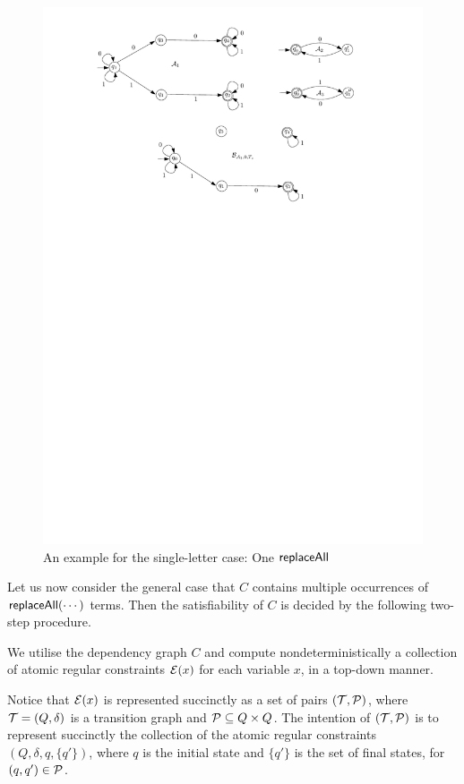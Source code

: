 \begin{example}
\begin{figure}[htbp]
\begin{center}
\includegraphics[scale=0.8]{single-letter-example.pdf}
\end{center}
\caption{An example for the single-letter case: One $\mathsf{replaceAll}$}\label{fig-sl-exmp}
\end{figure}
\end{example}

Let us now consider the general case that $C$ contains multiple occurrences of $\mathsf{replaceAll}(\cdots)$ terms. 
Then the satisfiability of $C$ is decided by the following two-step procedure.

\smallskip

 We utilise the dependency graph $C$ and compute nondeterministically a collection of atomic regular constraints $\mathcal{E}(x)$ for each variable $x$, in a top-down manner. 

Notice that $\mathcal{E}(x)$ is represented succinctly as a set of pairs $(\mathcal{T}, \mathcal{P})$, where $\mathcal{T}=(Q, \delta)$ is a transition graph and $\mathcal{P} \subseteq Q \times Q$. The intention of $(\mathcal{T}, \mathcal{P})$ is to represent succinctly the collection of the atomic regular constraints $(Q, \delta, q, \{q'\})$, where $q$ is the initial state and $\{q'\}$ is the set of final states, for $(q,q') \in \mathcal{P}$. 

